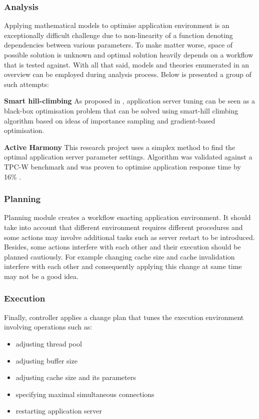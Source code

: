 \subsubsection{Analysis}
Applying mathematical models to optimise application environment is an exceptionally difficult challenge due to non-linearity of a function denoting dependencies between various parameters. To make matter worse, space of possible solution is unknown and optimal solution heavily depends on a workflow that is tested against. With all that said, models and theories enumerated in an overview can be employed during analysis process. Below is presented a group of such attempts:
\begin{asparaenum}
  \item[\textbf{Smart hill-climbing}] As proposed in \cite{xi2004smart}, application server tuning can be seen as a black-box optimisation problem that can be solved using smart-hill climbing algorithm based on ideas of importance sampling and gradient-based optimisation.

  \item[\textbf{Active Harmony}] This research project uses a simplex method to find the optimal application server parameter settings. Algorithm was validated against a TPC-W benchmark and was proven to optimise application response time by 16\% \cite{chung2004automated}.
\end{asparaenum}


\subsubsection{Planning}
Planning module creates a workflow enacting application environment. It should take into account that different environment requires different procedures and some actions may involve additional tasks such as server restart to be introduced. Besides, some actions interfere with each other and their execution should be planned cautiously. For example changing cache size and cache invalidation interfere with each other and consequently applying this change at same time may not be a good idea.

\subsubsection{Execution}
Finally, controller applies a change plan that tunes the execution environment involving operations such as:
\begin{itemize}
 \item adjusting thread pool
 \item adjusting buffer size
 \item adjusting cache size and its parameters
 \item specifying maximal simultaneous connections
 \item restarting application server
\end{itemize}


